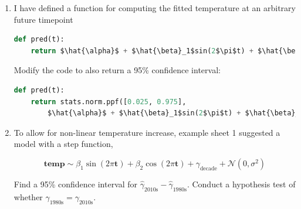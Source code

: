 \documentclass[10pt,\jkfside,a4paper]{article}
\begin{document}
\begin{enumerate}
\[
\mathbf{temp} \sim \alpha + \beta_1\sin(2\pi\mathbf{t}) + \beta_2\cos
(2\pi\mathbf{t}) + \gamma(\mathbf{t} - 2000) + \mathcal{N}(0, \sigma^2)
\]

Find a 95\% confidence interval for $\hat{\gamma}$, the maximum likelihood
estimator for the rate of temperature increase.

\begin{lstlisting}[language=Python]
n = ...
features = np.column_stack([
	np.ones_like(climate.t),
	np.sin(climate.t),
	np.cos(climate.t),
	climate.t
])
model = LinearRegression(fit_intercept=False).fit(features, climate.temp)
model_predict = model.predict(features)
std = np.std(model_predict - climate.temp)
gammas_resamp = np.array([
	LinearRegression(fit_intercept=False).fit(features,
		stats.norm.rvs(model_predict, std)).coef_[3]
			for _ in tqdm(range(n))
])
np.quantile(gammas_resamp, [0.025, 0.975])
\end{lstlisting}

Using the data from Cambridge, the 95\% confidence interval obtained is
$\hat{\gamma} \in [0.00857158, 0.04676771]$.

\item I have defined a function for computing the fitted temperature at an
arbitrary future timepoint

\begin{lstlisting}[language=Python, mathescape=true]
def pred(t):
	return $\hat{\alpha}$ + $\hat{\beta}_1$sin(2$\pi$t) + $\hat{\beta}_2$cos(2$\pi$t) + $\hat{\gamma}$(t - 2000)
\end{lstlisting}

Modify the code to also return a 95\% confidence interval:

\begin{lstlisting}[language=Python, mathescape=true]
def pred(t):
	return stats.norm.ppf([0.025, 0.975],
		$\hat{\alpha}$ + $\hat{\beta}_1$sin(2$\pi$t) + $\hat{\beta}_2$cos(2$\pi$t) + $\hat{\gamma}$(t - 2000), $\hat{\sigma}$)
\end{lstlisting}

\item To allow for non-linear temperature increase, example sheet 1
suggested a model with a step function,

\[
\mathbf{temp} \sim \beta_1\sin(2\pi\mathbf{t}) + \beta_2\cos(2\pi\mathbf{t})
 + \gamma_{\text{decade}} + \mathcal{N}(0, \sigma^2)
\]

Find a 95\% confidence interval for $\hat{\gamma}_{\text{2010s}} -
\hat{\gamma}_{\text{1980s}}$. Conduct a hypothesis test of whether
$\gamma_{\text{1980s}} = \gamma_{\text{2010s}}$.


\end{enumerate}
\end{document}

